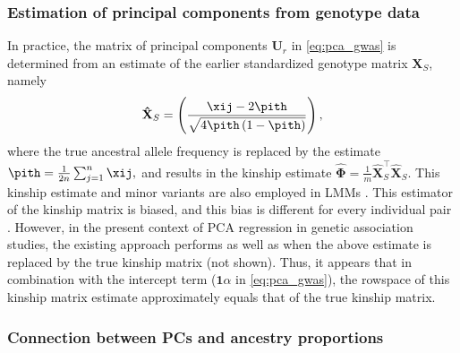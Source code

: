 \documentclass[11pt]{article}
\begin{document}
\subsubsection{Estimation of principal components from genotype data}

In practice, the matrix of principal components $\mathbf{U}_r$ in \cref{eq:pca_gwas} is determined from an estimate of the earlier standardized genotype matrix $\mathbf{X}_S$, namely
$$
\mathbf{\hat{X}}_S
=
\left(
  \frac{
    \xij - 2 \pith
  }{
    \sqrt{4 \pith \left( 1 - \pith \right)}
  }
\right)
,
$$
where the true ancestral allele frequency \pit is replaced by the estimate
$
\pith = \frac{1}{2n} \sum_{j = 1}^n \xij,
$
and results in the kinship estimate
$
\mathbf{\hat{\Phi}}
=
\frac{1}{m}
\mathbf{\hat{X}}_S^\intercal
\mathbf{\hat{X}}_S
.
$
This kinship estimate and minor variants are also employed in LMMs \citep{yang_gcta:_2011}.
This estimator of the kinship matrix is biased, and this bias is different for every individual pair \citep{ochoa_fst2, ochoa_human}.
However, in the present context of PCA regression in genetic association studies, the existing approach performs as well as when the above estimate is replaced by the true kinship matrix (not shown).
Thus, it appears that in combination with the intercept term ($\mathbf{1} \alpha$ in \cref{eq:pca_gwas}), the rowspace of this kinship matrix estimate approximately equals that of the true kinship matrix.

\subsubsection{Connection between PCs and ancestry proportions}
\end{document}
